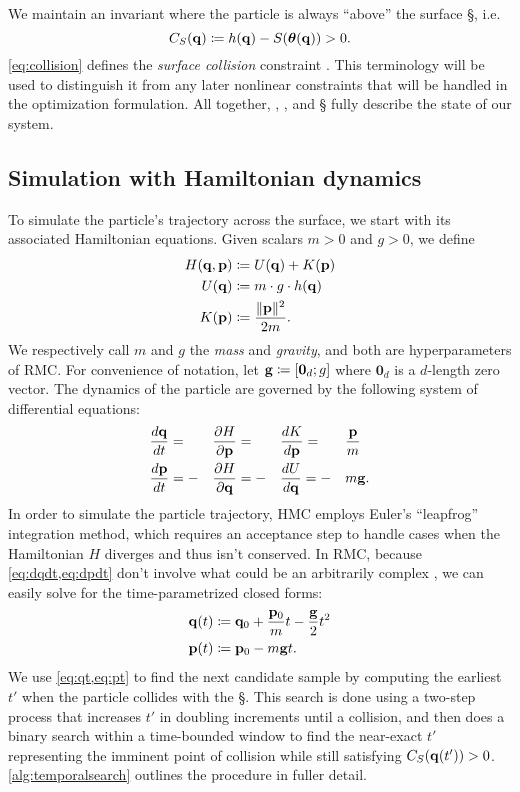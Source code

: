 We maintain an invariant where the particle is always ``above'' the surface \S,
i.e.
\begin{equation}
    \label{eq:collision}
    C_{S}({\mathbf{q}{}}) \coloneqq h(\mathbf{q}{}) - S(\boldsymbol{\theta}(\mathbf{q}{})) > 0.
\end{equation}
\cref{eq:collision} defines the \emph{surface collision} constraint \CS{}. This
terminology will be used to distinguish it from any later nonlinear constraints
that will be handled in the optimization formulation. All together, \q{}, \p{},
and \S{} fully describe the state of our system.

\subsection{Simulation with Hamiltonian dynamics} \label{ss:hamiltonian}

To simulate the particle's trajectory across the surface, we start with its
associated Hamiltonian equations. Given scalars $m > 0$ and $g > 0$, we define
\begin{align}
    H(\mathbf{q}{}, \mathbf{p}{}) &\coloneqq U(\mathbf{q}{}) + K(\mathbf{p}{}) \label{eq:H} \\
    U(\mathbf{q}{}) &\coloneqq m \cdot g \cdot h(\mathbf{q}{}) \label{eq:U} \\
    K(\mathbf{p}{}) &\coloneqq \frac{\lVert \mathbf{p}{} \rVert^2}{2m} \label{eq:K} .
\end{align}
We respectively call $m$ and $g$ the \emph{mass} and \emph{gravity}, and both
are hyperparameters of RMC. For convenience of notation, let $\mathbf{g}{} \coloneqq
[\mathbf{0}_d; g]$ where $\mathbf{0}_d$ is a $d$-length zero vector. The
dynamics of the particle are governed by the following system of differential
equations:
\begin{alignat}{4}
    &\frac{d\mathbf{q}{}}{dt} = &&\frac{\partial H}{\partial \mathbf{p}{}} = &&\frac{dK}{d\mathbf{p}{}} = &&\frac{\mathbf{p}{}}{m} \label{eq:dqdt} \\
    &\frac{d\mathbf{p}{}}{dt} = -&&\frac{\partial H}{\partial \mathbf{q}{}} = -&&\frac{dU}{d\mathbf{q}{}} = -&&m\mathbf{g}{}. \label{eq:dpdt}
\end{alignat}
In order to simulate the particle trajectory, HMC employs Euler's ``leapfrog''
integration method, which requires an acceptance step to handle cases when the
Hamiltonian $H$ diverges and thus isn't conserved. In RMC, because
\cref{eq:dqdt,eq:dpdt} don't involve what could be an arbitrarily complex
\surface{}, we can easily solve for the time-parametrized closed forms:
\begin{align}
    \mathbf{q}(t){} &\coloneqq \mathbf{q}_{0}{} + \frac{\mathbf{p}_{0}{}}{m}t - \frac{\mathbf{g}{}}{2}t^2 \label{eq:qt} \\
    \mathbf{p}(t){} &\coloneqq \mathbf{p}_{0}{} - m\mathbf{g}{}t. \label{eq:pt}
\end{align}
We use \cref{eq:qt,eq:pt} to find the next candidate sample \thetai{} by
computing the earliest $t'$ when the particle collides with the \S{}. This
search is done using a two-step process that increases $t'$ in doubling
increments until a collision, and then does a binary search within a
time-bounded window to find the near-exact $t'$ representing the imminent point
of collision while still satisfying $C_{S}({\mathbf{q}(t')}) > 0$.
\cref{alg:temporalsearch} outlines the procedure in fuller detail.


